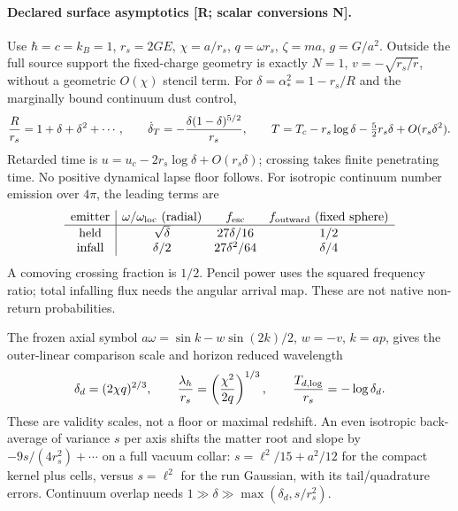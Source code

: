 
\paragraph{Declared surface asymptotics [R; scalar conversions N].}
Use $\hbar=c=k_B=1$, $r_s=2GE$, $\chi=a/r_s$, $q=\omega r_s$,
$\zeta=ma$, $g=G/a^2$. Outside the full source support the fixed-charge
geometry is exactly $N=1$, $v=-\sqrt{r_s/r}$, without a geometric
$O(\chi)$ stencil term. For $\delta=\alpha_*^2=1-r_s/R$ and the
marginally bound continuum dust control,
\[
 {R\over r_s}=1+\delta+\delta^2+\cdots,\qquad
 \dot\delta_T=-{\delta(1-\delta)^{5/2}\over r_s},\qquad
 T=T_c-r_s\log\delta-\tfrac52r_s\delta+O(r_s\delta^2).
\]
Retarded time is $u=u_c-2r_s\log\delta+O(r_s\delta)$; crossing takes
finite penetrating time. No positive dynamical lapse floor follows.
For isotropic continuum number emission over $4\pi$, the leading terms are
\[
\begin{array}{c|ccc}
 \text{emitter}&\omega/\omega_{\rm loc}\ (\text{radial})&f_{\rm esc}
 &f_{\rm outward}\ (\text{fixed sphere})\\ \hline
 \text{held}&\sqrt\delta&27\delta/16&1/2\\
 \text{infall}&\delta/2&27\delta^2/64&\delta/4
\end{array}
\]
A comoving crossing fraction is $1/2$. Pencil power uses the squared
frequency ratio; total infalling flux needs the angular arrival map.
These are not native non-return probabilities.

The frozen axial symbol $a\omega=\sin k-w\sin(2k)/2$, $w=-v$, $k=ap$, gives
the outer-linear comparison scale and horizon reduced wavelength
\[
 \delta_d=(2\chi q)^{2/3},\qquad
 {\lambda_h\over r_s}=\left({\chi^2\over2q}\right)^{1/3},\qquad
 {T_{d,\log}\over r_s}=-\log\delta_d .
\]
These are validity scales, not a floor or maximal redshift.
An even isotropic back-average of variance $s$ per axis shifts the
matter root and slope by $-9s/(4r_s^2)+\cdots$ on a full vacuum collar:
$s=\ell^2/15+a^2/12$ for the compact kernel plus cells, versus
$s=\ell^2$ for the run Gaussian, with its tail/quadrature errors.
Continuum overlap needs $1\gg\delta\gg\max(\delta_d,s/r_s^2)$.

